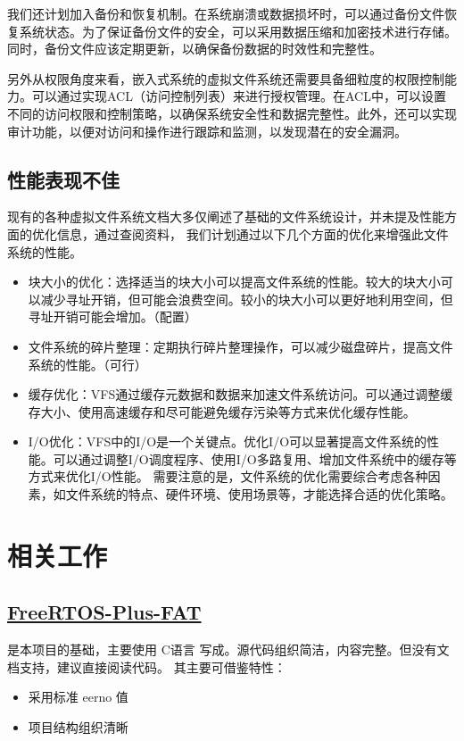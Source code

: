 \documentclass[UTF8,a4paper]{ctexart}
\begin{document}
我们还计划加入备份和恢复机制。在系统崩溃或数据损坏时，可以通过备份文件恢复系统状态。为了保证备份文件的安全，可以采用数据压缩和加密技术进行存储。同时，备份文件应该定期更新，以确保备份数据的时效性和完整性。

另外从权限角度来看，嵌入式系统的虚拟文件系统还需要具备细粒度的权限控制能力。可以通过实现ACL（访问控制列表）来进行授权管理。在ACL中，可以设置不同的访问权限和控制策略，以确保系统安全性和数据完整性。此外，还可以实现审计功能，以便对访问和操作进行跟踪和监测，以发现潜在的安全漏洞。
\subsection{性能表现不佳}
现有的各种虚拟文件系统文档大多仅阐述了基础的文件系统设计，并未提及性能方面的优化信息，通过查阅资料，
我们计划通过以下几个方面的优化来增强此文件系统的性能。
\begin{itemize}
 	\item 块大小的优化：选择适当的块大小可以提高文件系统的性能。较大的块大小可以减少寻址开销，但可能会浪费空间。较小的块大小可以更好地利用空间，但寻址开销可能会增加。（配置）
	\item 文件系统的碎片整理：定期执行碎片整理操作，可以减少磁盘碎片，提高文件系统的性能。（可行）
 	\item 缓存优化：VFS通过缓存元数据和数据来加速文件系统访问。可以通过调整缓存大小、使用高速缓存和尽可能避免缓存污染等方式来优化缓存性能。
	\item I/O优化：VFS中的I/O是一个关键点。优化I/O可以显著提高文件系统的性能。可以通过调整I/O调度程序、使用I/O多路复用、增加文件系统中的缓存等方式来优化I/O性能。
需要注意的是，文件系统的优化需要综合考虑各种因素，如文件系统的特点、硬件环境、使用场景等，才能选择合适的优化策略。
\end{itemize}
\section{相关工作}
\subsection{\href{https://www.freertos.org/zh-cn-cmn-s/FreeRTOS-Plus/FreeRTOS_Plus_FAT/index.html}{FreeRTOS-Plus-FAT}}
是本项目的基础，主要使用 C语言 写成。源代码组织简洁，内容完整。但没有文档支持，建议直接阅读代码。
其主要可借鉴特性：
\begin{itemize}
    \item 采用标准 eerno 值
    \item 项目结构组织清晰
\end{itemize}
\end{document}
